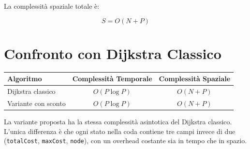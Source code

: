 La complessità spaziale totale è:

\begin{equation}
    S = O(N + P)
\end{equation}

\section{Confronto con Dijkstra Classico}

\begin{center}
\begin{tabular}{|l|c|c|}
\hline
\textbf{Algoritmo} & \textbf{Complessità Temporale} & \textbf{Complessità Spaziale} \\
\hline
Dijkstra classico      & $O(P \log P)$ & $O(N + P)$ \\
Variante con sconto    & $O(P \log P)$ & $O(N + P)$ \\
\hline
\end{tabular}
\end{center}

\vspace{0.5cm}
La variante proposta ha la stessa complessità asintotica del Dijkstra 
classico. L'unica differenza è che ogni stato nella coda contiene 
tre campi invece di due (\texttt{totalCost}, \texttt{maxCost}, 
\texttt{node}), con un overhead costante sia in tempo che in spazio.